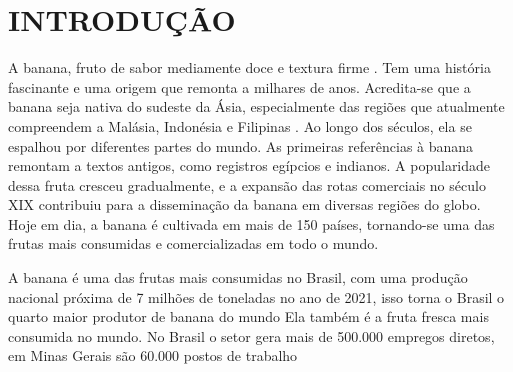 \chapter{INTRODUÇÃO}
A banana, fruto de sabor mediamente doce e textura firme \cite{MATSUURA2004}. Tem uma história fascinante e uma origem que remonta a milhares de anos. Acredita-se que a banana seja nativa do sudeste da Ásia, especialmente das regiões que atualmente compreendem a Malásia, Indonésia e Filipinas \cite{1956TaOo}. Ao longo dos séculos, ela se espalhou por diferentes partes do mundo. As primeiras referências à banana remontam a textos antigos, como registros egípcios e indianos. A popularidade dessa fruta cresceu gradualmente, e a expansão das rotas comerciais no século XIX contribuiu para a disseminação da banana em diversas regiões do globo. Hoje em dia, a banana é cultivada em mais de 150 países, tornando-se uma das frutas mais consumidas e comercializadas em todo o mundo.

A banana é uma das frutas mais consumidas no Brasil, com uma produção nacional próxima de 7 milhões de toneladas no ano de 2021, isso torna o Brasil o quarto maior produtor de banana do mundo \cite{banana} Ela também é a fruta fresca mais consumida no mundo. No Brasil o setor gera mais de 500.000 empregos diretos, em Minas Gerais são 60.000 postos de trabalho